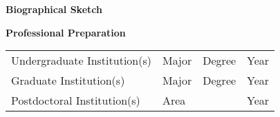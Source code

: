 \renewcommand{\thepage}{Biographical Sketch:  - Page \arabic{page} of 2}

\begin{comment}
Biographical Sketch [2 page limit]. Submit your CV in the section Biographical Sketches. Follow the
form in the Grants Program Guide II.C.2.f.i for senior personnel. List conference abstracts and titles of
presentations separately from peer--?reviewed articles. For unpublished manuscripts, list only those
submitted or accepted for publication (along with most likely date of publication).
\end{comment}





\setcounter{page}{1}
\renewcommand{\thepage}{Biographical Sketch - Page \arabic{page} of 2}
\begin{center}
\textbf{\large Biographical Sketch}
\end{center}


{\bf Professional Preparation}

\begin{tabular}{llll}
Undergraduate Institution(s) \hspace{0.5in} & Major \hspace{1in} & Degree  \hspace{0.25in} & Year \\
Graduate Institution(s)                     & Major              & Degree                  & Year \\
Postdoctoral Institution(s)                 & Area               &                         & Year
\end{tabular}




